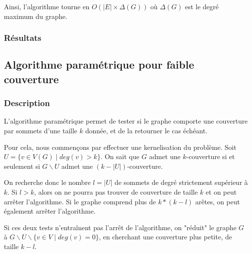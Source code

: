 \documentclass[a4paper,10pt]{article}
\begin{document}
Ainsi, l'algorithme tourne en $O(|E|\times \Delta(G))$ où $\Delta(G)$ est le degré maximum du graphe.

\subsubsection{Résultats}


\subsection{Algorithme paramétrique pour faible couverture}

\subsubsection{Description}

L'algorithme paramétrique permet de tester si le graphe comporte une couverture par sommets d'une taille $k$ donnée, et de la retourner le cas échéant.

\bigskip
Pour cela, nous commençons par effectuer une kernelisation du problème. Soit $U = \{ v \in V(G) \mid deg(v) > k\}$. On sait que $G$ admet une $k$-couverture si et seulement si $G \smallsetminus U$ admet une $(k - |U|)$-couverture.

On recherche donc le nombre $l = |U|$ de sommets de degré strictement supérieur à $k$. 
Si $l > k$, alors on ne pourra pas trouver de couverture de taille $k$ et on peut arrêter l'algorithme.
Si le graphe comprend plus de $k*(k-l)$ arêtes, on peut également arrêter l'algorithme.

Si ces deux tests n'entraînent pas l'arrêt de l'algorithme, on "réduit" le graphe $G$ à $G \smallsetminus U \smallsetminus \{v \in V \mid deg(v) = 0\}$, en cherchant une couverture plus petite, de taille $k-l$.
\end{document}
